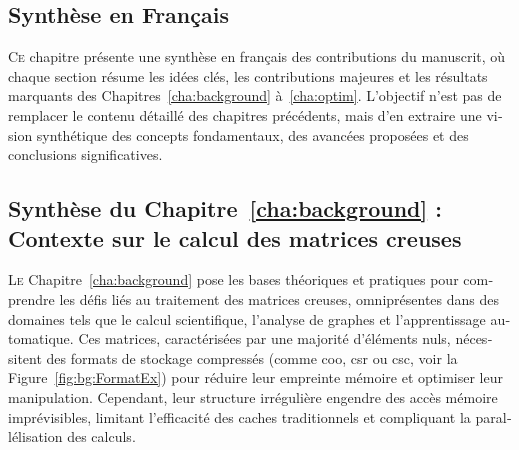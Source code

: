 
\FancyHeadRight{\sectitle}

\renewcommand{\sectitle}{Synth\`ese en Fran\c cais}

\begin{otherlanguage}{french}

\chapter*{\sectitle}
\addstarredchapter{\sectitle}

\minitoc

\setcounter{synthFCnt}{0}
\renewcommand{\thesection}{\arabic{synthFCnt}}


\vspace*{1cm}
\lettrine{C}{e} chapitre présente une synthèse en français des contributions du manuscrit, où chaque section résume les idées clés, les contributions majeures et les résultats marquants des Chapitres~\ref{cha:background} à~\ref{cha:optim}.
L'objectif n'est pas de remplacer le contenu détaillé des chapitres précédents, mais d'en extraire une vision synthétique des concepts fondamentaux, des avancées proposées et des conclusions significatives.


\addtocounter{synthFCnt}{1}
\section{Synthèse du Chapitre~\ref{cha:background} : Contexte sur le calcul des matrices creuses}

\lettrine{L}{e} Chapitre~\ref{cha:background} pose les bases théoriques et pratiques pour comprendre les défis liés au traitement des matrices creuses, omniprésentes dans des domaines tels que le calcul scientifique, l'analyse de graphes et l'apprentissage automatique.
Ces matrices, caractérisées par une majorité d'éléments nuls, nécessitent des formats de stockage compressés (comme \acrshort{coo}, \acrshort{csr} ou \acrshort{csc}, voir la Figure~\ref{fig:bg:FormatEx}) pour réduire leur empreinte mémoire et optimiser leur manipulation.
Cependant, leur structure irrégulière engendre des accès mémoire imprévisibles, limitant l'efficacité des caches traditionnels et compliquant la parallélisation des calculs.


\end{otherlanguage}
